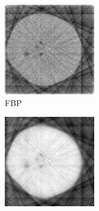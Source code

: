 \documentclass[journal]{IEEEtran}
\begin{document}
\begin{figure}[!h]
    \begin{subfigure}[b]{0.24\linewidth}
        \includegraphics[width=\textwidth]{../images/potato/post_tci/comparison/fbp.png}
        \caption{FBP}
    \end{subfigure}
    \begin{subfigure}[b]{0.24\linewidth}
        \includegraphics[width=\textwidth]{../images/potato/post_tci/comparison/cs_dct.png}

\end{subfigure}
\end{figure}
\end{document}
